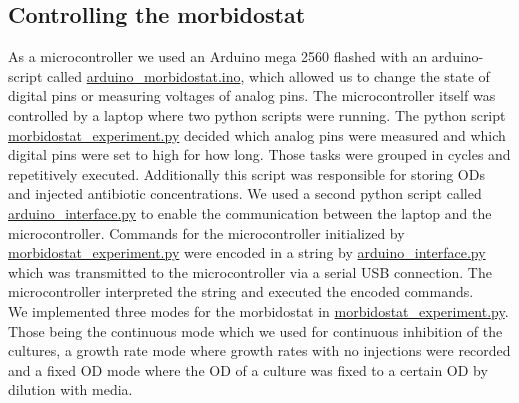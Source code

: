 \subsection{Controlling the morbidostat}
As a microcontroller we used an Arduino mega 2560 flashed with an arduino-script called \href{https://github.com/nahanoo/ESBL\_project/}{arduino\_morbidostat.ino}, which allowed us to change the state of digital pins or measuring voltages of analog pins. The microcontroller itself was controlled by a laptop where two python scripts were running. The python script \href{https://github.com/nahanoo/ESBL\_project/}{morbidostat\_experiment.py} decided which analog pins were measured and which digital pins were set to high for how long. Those tasks were grouped in cycles and repetitively executed. Additionally this script was responsible for storing ODs and injected antibiotic concentrations. We used a second python script called \href{https://github.com/nahanoo/ESBL\_project/}{arduino\_interface.py} to enable the communication between the laptop and the microcontroller. Commands for the microcontroller initialized by \href{https://github.com/nahanoo/ESBL\_project/}{morbidostat\_experiment.py} were encoded in a string by \href{https://github.com/nahanoo/ESBL\_project/}{arduino\_interface.py} which was transmitted to the microcontroller via a serial USB connection. The microcontroller interpreted the string and executed the encoded commands. \\
We implemented three modes for the morbidostat in \href{https://github.com/nahanoo/ESBL\_project/}{morbidostat\_experiment.py}. Those being the continuous mode which we used for continuous inhibition of the cultures, a growth rate mode where growth rates with no injections were recorded and a fixed OD mode where the OD of a culture was fixed to a certain OD by dilution with media. \\   

